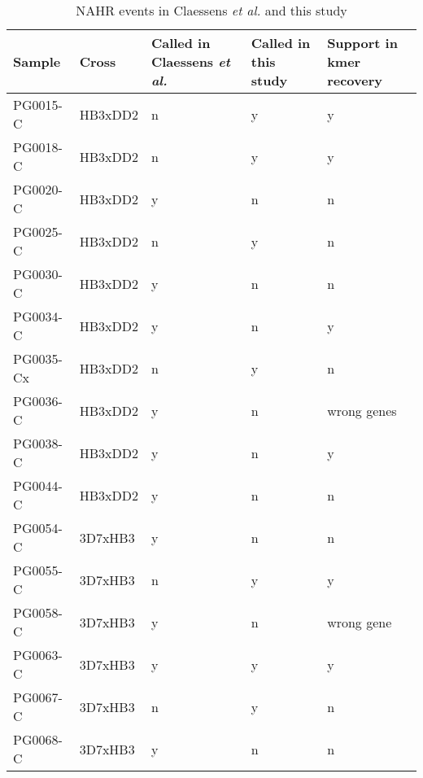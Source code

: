 \begin{table}[]
\centering
\caption{NAHR events in Claessens \textit{et al.} and this study}
\label{tbl:nahrcompare}
\begin{tabular}{@{}lllll@{}}
\toprule
Sample    & Cross   & Called in Claessens \textit{et al.} & Called in this study & Support in kmer recovery \\ \midrule
PG0015-C  & HB3xDD2 & n                         & y                    & y                        \\
PG0018-C  & HB3xDD2 & n                         & y                    & y                        \\
PG0020-C  & HB3xDD2 & y                         & n                    & n                        \\
PG0025-C  & HB3xDD2 & n                         & y                    & n                        \\
PG0030-C  & HB3xDD2 & y                         & n                    & n                        \\
PG0034-C  & HB3xDD2 & y                         & n                    & y                        \\
PG0035-Cx & HB3xDD2 & n                         & y                    & n                        \\
PG0036-C  & HB3xDD2 & y                         & n                    & wrong genes              \\
PG0038-C  & HB3xDD2 & y                         & n                    & y                        \\
PG0044-C  & HB3xDD2 & y                         & n                    & n                        \\
PG0054-C  & 3D7xHB3 & y                         & n                    & n                        \\
PG0055-C  & 3D7xHB3 & n                         & y                    & y                        \\
PG0058-C  & 3D7xHB3 & y                         & n                    & wrong gene               \\
PG0063-C  & 3D7xHB3 & y                         & y                    & y                        \\
PG0067-C  & 3D7xHB3 & n                         & y                    & n                        \\
PG0068-C  & 3D7xHB3 & y                         & n                    & n                        \\

\end{tabular}
\end{table}
